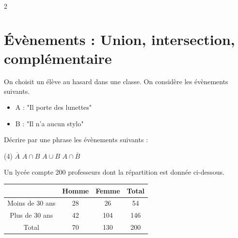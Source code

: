 \documentclass[10pt,a4paper]{article}
\begin{document}
\begin{multicols}{2}

\section{Évènements : Union, intersection, complémentaire}
\begin{exo}
    On choisit un élève au hasard dans une classe. On considère les évènements suivants.\begin{itemize}
        \item A : "Il porte des lunettes"
        \item B : "Il n'a aucun stylo"
    \end{itemize}
    Décrire par une phrase les évènements suivants :\begin{tasks}(4)
        \task \(\overline{A}\)
        \task \(A\cap B\)
        \task \(A \cup B\)
        \task \(A\cap \overline{B}\)
    \end{tasks}
\end{exo}


\begin{exo}
    Un lycée compte 200 professeurs dont la répartition est donnée ci-dessous.

    \begin{tabular}{|c|c|c|c|}
        \hline
         & Homme & Femme  & Total \\
        \hline
        Moins de 30 ans & 28 & 26 & 54 \\
        \hline
        Plus de 30 ans & 42 & 104 & 146 \\
        \hline 
        Total & 70 & 130 &  200\\
        \hline
    \end{tabular}


\end{exo}
\end{multicols}
\end{document}
